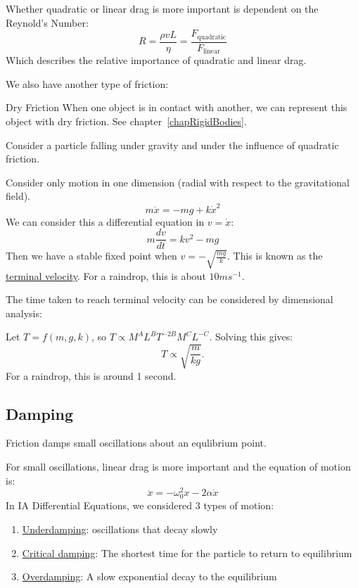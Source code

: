 \documentclass[../Main.tex]{subfiles}
\begin{document}
Whether quadratic or linear drag is more important is dependent on the Reynold's Number:
\begin{equation*}
    R = \frac{\rho v L}{\eta} = \frac{F_{\text{quadratic}}}{F_{\text{linear}}}
\end{equation*}
Which describes the relative importance of quadratic and linear drag.\par
We also have another type of friction:
\begin{definition}{Dry Friction}
    When one object is in contact with another, we can represent this object with dry friction. See chapter~\ref{chapRigidBodies}.
\end{definition}
\begin{example}
    Consider a particle falling under gravity and under the influence of quadratic friction.\par
    Consider only motion in one dimension (radial with respect to the gravitational field).
    \begin{equation*}
        m\ddot{x} = -mg + k \dot{x}^2
    \end{equation*}
    We can consider this a differential equation in $v = \dot{x}$:
    \begin{equation*}
        m\frac{dv}{dt} = kv^2 - mg
    \end{equation*}
    Then we have a stable fixed point when $v = -\sqrt{\frac{mg}{k}}$. This is known as the \underline{terminal velocity}. For a raindrop, this is about $10 m s^{-1}$.\par
    The time taken to reach terminal velocity can be considered by dimensional analysis:\par
    Let $T = f(m, g, k)$, so $T \propto M^A L^B T^{-2B} M^C L^{-C}$. Solving this gives:
    \begin{equation*}
        T \propto \sqrt{\frac{m}{kg}}.
    \end{equation*}
    For a raindrop, this is around 1 second.
\end{example}
\subsection{Damping}
Friction damps small oscillations about an equlibrium point.\par
For small oscillations, linear drag is more important and the equation of motion is:
\begin{equation}
    \ddot{x} = -\omega_0^2 x - 2\alpha\dot{x}
    \label{eqnDamptedOscillation.}
\end{equation}
In IA Differential Equations, we considered 3 types of motion:
\begin{enumerate}
    \item \underline{Underdamping}: oscillations that decay slowly
    \item \underline{Critical damping}: The shortest time for the particle to return to equilibrium
    \item \underline{Overdamping}: A slow exponential decay to the equilibrium
\end{enumerate}
\end{document}
